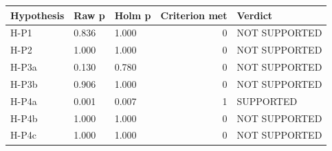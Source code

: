 \begin{tabular}{lllrl}
\toprule
Hypothesis & Raw p & Holm p & Criterion met & Verdict \\
\midrule
H-P1 & 0.836 & 1.000 & 0 & NOT SUPPORTED \\
H-P2 & 1.000 & 1.000 & 0 & NOT SUPPORTED \\
H-P3a & 0.130 & 0.780 & 0 & NOT SUPPORTED \\
H-P3b & 0.906 & 1.000 & 0 & NOT SUPPORTED \\
H-P4a & 0.001 & 0.007 & 1 & SUPPORTED \\
H-P4b & 1.000 & 1.000 & 0 & NOT SUPPORTED \\
H-P4c & 1.000 & 1.000 & 0 & NOT SUPPORTED \\
\bottomrule
\end{tabular}
